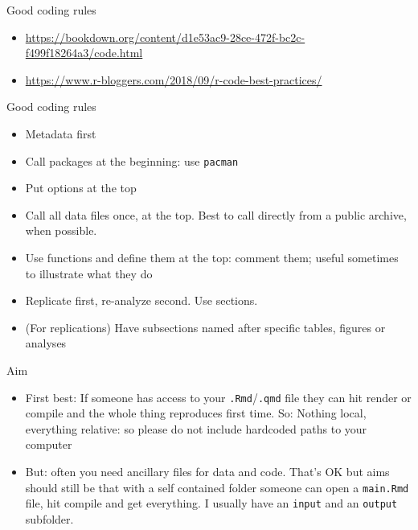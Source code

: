 \documentclass[
  11pt,
  ignorenonframetext,
]{beamer}
\providecommand{\tightlist}{%
  \setlength{\itemsep}{0pt}\setlength{\parskip}{0pt}}\usepackage{longtable,booktabs,array}
\begin{document}
\begin{frame}{Good coding rules}
\protect\hypertarget{good-coding-rules}{}
\begin{itemize}
\tightlist
\item
  \url{https://bookdown.org/content/d1e53ac9-28ce-472f-bc2c-f499f18264a3/code.html}
\item
  \url{https://www.r-bloggers.com/2018/09/r-code-best-practices/}
\end{itemize}
\end{frame}

\begin{frame}[fragile]{Good coding rules}
\protect\hypertarget{good-coding-rules-1}{}
\begin{itemize}
\tightlist
\item
  Metadata first
\item
  Call packages at the beginning: use \texttt{pacman}
\item
  Put options at the top
\item
  Call all data files once, at the top. Best to call directly from a
  public archive, when possible.\\
\item
  Use functions and define them at the top: comment them; useful
  sometimes to illustrate what they do
\item
  Replicate first, re-analyze second. Use sections.
\item
  (For replications) Have subsections named after specific tables,
  figures or analyses
\end{itemize}
\end{frame}

\begin{frame}[fragile]{Aim}
\protect\hypertarget{aim}{}
\begin{itemize}
\item
  First best: If someone has access to your \texttt{.Rmd}/\texttt{.qmd}
  file they can hit render or compile and the whole thing reproduces
  first time. So: Nothing local, everything relative: so please do not
  include hardcoded paths to your computer
\item
  But: often you need ancillary files for data and code. That's OK but
  aims should still be that with a self contained folder someone can
  open a \texttt{main.Rmd} file, hit compile and get everything. I
  usually have an \texttt{input} and an \texttt{output} subfolder.
\end{itemize}
\end{frame}
\end{document}
